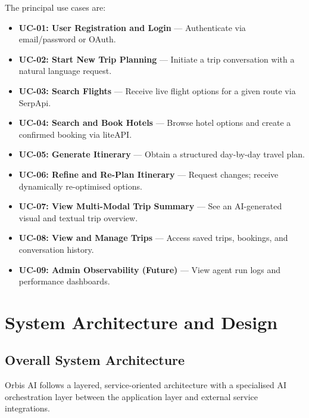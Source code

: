 \documentclass[12pt, a4paper]{article}
\begin{document}
The principal use cases are:

\begin{itemize}[leftmargin=1.5cm, itemsep=0.3em]
  \item \textbf{UC-01: User Registration and Login} --- Authenticate via email/password or OAuth.
  \item \textbf{UC-02: Start New Trip Planning} --- Initiate a trip conversation with a natural language request.
  \item \textbf{UC-03: Search Flights} --- Receive live flight options for a given route via SerpApi.
  \item \textbf{UC-04: Search and Book Hotels} --- Browse hotel options and create a confirmed booking via liteAPI.
  \item \textbf{UC-05: Generate Itinerary} --- Obtain a structured day-by-day travel plan.
  \item \textbf{UC-06: Refine and Re-Plan Itinerary} --- Request changes; receive dynamically re-optimised options.
  \item \textbf{UC-07: View Multi-Modal Trip Summary} --- See an AI-generated visual and textual trip overview.
  \item \textbf{UC-08: View and Manage Trips} --- Access saved trips, bookings, and conversation history.
  \item \textbf{UC-09: Admin Observability (Future)} --- View agent run logs and performance dashboards.
\end{itemize}

\section{System Architecture and Design}

\subsection{Overall System Architecture}

Orbis AI follows a layered, service-oriented architecture with a specialised AI orchestration layer between the application layer and external service integrations.
\end{document}
